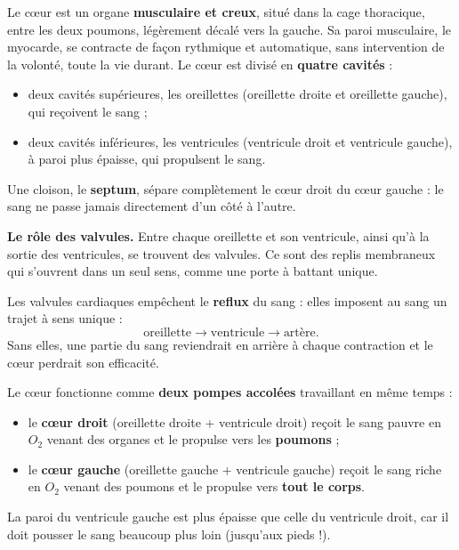 \documentclass[11pt]{article}
\newcommand{\cle}[1]{{\popxbold\color{popdark}#1}}
\begin{document}
\begin{definition}[Le cœur]
Le cœur est un organe \textbf{musculaire et creux}, situé dans la cage thoracique, entre les deux poumons, légèrement décalé vers la gauche. Sa paroi musculaire, le \cle{myocarde}, se contracte de façon rythmique et automatique, sans intervention de la volonté, toute la vie durant. Le cœur est divisé en \textbf{quatre cavités} :
\begin{itemize}
\item deux cavités supérieures, les \cle{oreillettes} (oreillette droite et oreillette gauche), qui reçoivent le sang ;
\item deux cavités inférieures, les \cle{ventricules} (ventricule droit et ventricule gauche), à paroi plus épaisse, qui propulsent le sang.
\end{itemize}
Une cloison, le \textbf{septum}, sépare complètement le cœur droit du cœur gauche : le sang ne passe jamais directement d'un côté à l'autre.
\end{definition}

\textbf{Le rôle des valvules.} Entre chaque oreillette et son ventricule, ainsi qu'à la sortie des ventricules, se trouvent des \cle{valvules}. Ce sont des replis membraneux qui s'ouvrent dans un seul sens, comme une porte à battant unique.

\begin{propriete}
Les valvules cardiaques empêchent le \textbf{reflux} du sang : elles imposent au sang un trajet à sens unique :
\[ \text{oreillette} \longrightarrow \text{ventricule} \longrightarrow \text{artère}. \]
Sans elles, une partie du sang reviendrait en arrière à chaque contraction et le cœur perdrait son efficacité.
\end{propriete}

\begin{propriete}
Le cœur fonctionne comme \textbf{deux pompes accolées} travaillant en même temps :
\begin{itemize}
\item le \textbf{cœur droit} (oreillette droite + ventricule droit) reçoit le sang pauvre en $O_2$ venant des organes et le propulse vers les \textbf{poumons} ;
\item le \textbf{cœur gauche} (oreillette gauche + ventricule gauche) reçoit le sang riche en $O_2$ venant des poumons et le propulse vers \textbf{tout le corps}.
\end{itemize}
La paroi du ventricule gauche est plus épaisse que celle du ventricule droit, car il doit pousser le sang beaucoup plus loin (jusqu'aux pieds !).
\end{propriete}
\end{document}

